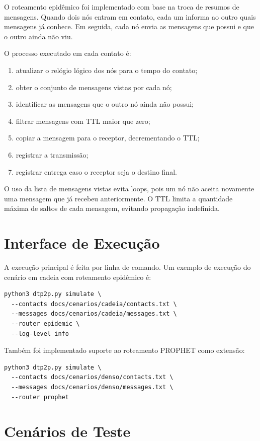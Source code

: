 \documentclass[12pt,a4paper]{article}
\begin{document}
O roteamento epidêmico foi implementado com base na troca de resumos de mensagens. Quando
dois nós entram em contato, cada um informa ao outro quais mensagens já conhece. Em seguida,
cada nó envia as mensagens que possui e que o outro ainda não viu.

O processo executado em cada contato é:

\begin{enumerate}
  \item atualizar o relógio lógico dos nós para o tempo do contato;
  \item obter o conjunto de mensagens vistas por cada nó;
  \item identificar as mensagens que o outro nó ainda não possui;
  \item filtrar mensagens com TTL maior que zero;
  \item copiar a mensagem para o receptor, decrementando o TTL;
  \item registrar a transmissão;
  \item registrar entrega caso o receptor seja o destino final.
\end{enumerate}

O uso da lista de mensagens vistas evita loops, pois um nó não aceita novamente uma mensagem
que já recebeu anteriormente. O TTL limita a quantidade máxima de saltos de cada mensagem,
evitando propagação indefinida.

\section{Interface de Execução}

A execução principal é feita por linha de comando. Um exemplo de execução do cenário em
cadeia com roteamento epidêmico é:

\begin{lstlisting}
python3 dtp2p.py simulate \
  --contacts docs/cenarios/cadeia/contacts.txt \
  --messages docs/cenarios/cadeia/messages.txt \
  --router epidemic \
  --log-level info
\end{lstlisting}

Também foi implementado suporte ao roteamento PROPHET como extensão:

\begin{lstlisting}
python3 dtp2p.py simulate \
  --contacts docs/cenarios/denso/contacts.txt \
  --messages docs/cenarios/denso/messages.txt \
  --router prophet
\end{lstlisting}

\section{Cenários de Teste}
\end{document}
